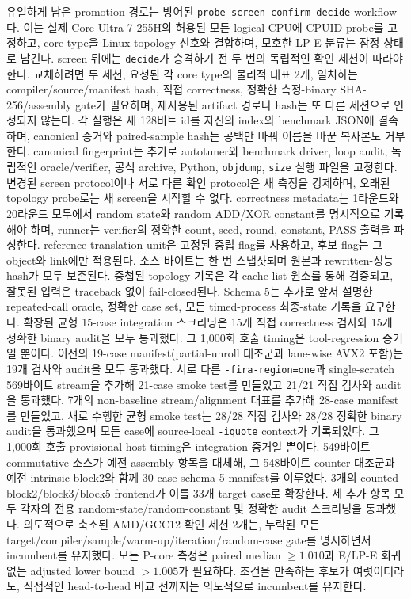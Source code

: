 \documentclass[11pt,a4paper]{article}
\begin{document}
유일하게 남은 promotion 경로는 방어된
\texttt{probe--screen--confirm--decide} workflow다.  이는 실제 Core
Ultra 7 255H의 허용된 모든 logical CPU에 CPUID probe를 고정하고, core
type을 Linux topology 신호와 결합하며, 모호한 LP-E 분류는 잠정 상태로
남긴다.  screen 뒤에는 \texttt{decide}가 승격하기 전 두 번의 독립적인
확인 세션이 따라야 한다.  교체하려면 두 세션, 요청된 각 core type의
물리적 대표 2개, 일치하는 compiler/source/manifest hash, 직접
correctness, 정확한 측정-binary SHA-256/assembly gate가 필요하며, 재사용된
artifact 경로나 hash는 또 다른 세션으로 인정되지 않는다.  각 실행은
새 128비트 id를 자신의 index와 benchmark JSON에 결속하며,
canonical 증거와 paired-sample hash는 공백만 바꿔 이름을 바꾼 복사본도
거부한다.  canonical fingerprint는 추가로 autotuner와 benchmark
driver, loop audit, 독립적인 oracle/verifier, 공식 archive, Python,
\texttt{objdump}, \texttt{size} 실행 파일을 고정한다.  변경된 screen
protocol이나 서로 다른 확인 protocol은 새 측정을 강제하며, 오래된
topology probe로는 새 screen을 시작할 수 없다.  correctness metadata는
1라운드와 20라운드 모두에서 random state와 random ADD/XOR constant를
명시적으로 기록해야 하며, runner는 verifier의 정확한 count, seed,
round, constant, PASS 출력을 파싱한다.  reference translation unit은
고정된 중립 flag를 사용하고, 후보 flag는 그 object와 link에만
적용된다.  소스 바이트는 한 번 스냅샷되며 원본과 rewritten-성능 hash가
모두 보존된다.  중첩된 topology 기록은 각 cache-list 원소를 통해
검증되고, 잘못된 입력은 traceback 없이 fail-closed된다.  Schema 5는
추가로 앞서 설명한 repeated-call oracle, 정확한 case set, 모든
timed-process 최종-state 기록을 요구한다.  확장된 균형 15-case
integration 스크리닝은 15개 직접 correctness 검사와 15개 정확한
binary audit을 모두 통과했다. 그 1,000회 호출 timing은
tool-regression 증거일 뿐이다.  이전의 19-case manifest(partial-unroll
대조군과 lane-wise AVX2 포함)는 19개 검사와 audit을 모두 통과했다.
서로 다른 \texttt{-fira-region=one}과 single-scratch 569바이트
stream을 추가해 21-case smoke test를 만들었고 21/21 직접 검사와 audit을
통과했다.  7개의 non-baseline stream/alignment 대표를 추가해 28-case
manifest를 만들었고, 새로 수행한 균형 smoke test는 28/28 직접 검사와
28/28 정확한 binary audit을 통과했으며 모든 case에 source-local
\texttt{-iquote} context가 기록되었다.  그 1,000회 호출
provisional-host timing은 integration 증거일 뿐이다.  549바이트
commutative 소스가 예전 assembly 항목을 대체해, 그 548바이트
counter 대조군과 예전 intrinsic block2와 함께 30-case schema-5
manifest를 이루었다.  3개의 counted block2/block3/block5 frontend가 이를 33개
target case로 확장한다.  세 추가 항목 모두 각자의 전용
random-state/random-constant 및 정확한 audit 스크리닝을 통과했다.
의도적으로 축소된 AMD/GCC12 확인 세션 2개는, 누락된 모든
target/compiler/sample/warm-up/iteration/random-case gate를 명시하면서
incumbent를 유지했다.  모든 P-core 측정은 paired median $\ge 1.010$과
E/LP-E 회귀 없는 adjusted lower bound $>1.005$가 필요하다.  조건을
만족하는 후보가 여럿이더라도, 직접적인 head-to-head 비교 전까지는
의도적으로 incumbent를 유지한다.
\end{document}
